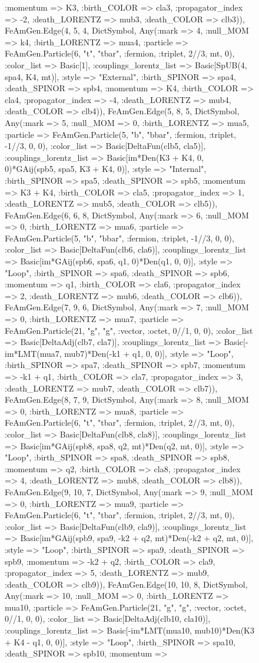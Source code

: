 \documentclass{revtex4}
\begin{document}
\begin{figure}[!htb]
\begin{center}
{:momentum => K3, :birth_COLOR => cla3, :propagator_index => -2, :death_LORENTZ => mub3, :death_COLOR => clb3)), FeAmGen.Edge(4, 5, 4, Dict{Symbol, Any}(:mark => 4, :null_MOM => k4, :birth_LORENTZ => mua4, :particle => FeAmGen.Particle(6, "t", "tbar", :fermion, :triplet, 2//3, mt, 0), :color_list => Basic[1], :couplings_lorentz_list => Basic[SpUB(4, spa4, K4, mt)], :style => "External", :birth_SPINOR => spa4, :death_SPINOR => spb4, :momentum => K4, :birth_COLOR => cla4, :propagator_index => -4, :death_LORENTZ => mub4, :death_COLOR => clb4)), FeAmGen.Edge(5, 8, 5, Dict{Symbol, Any}(:mark => 5, :null_MOM => 0, :birth_LORENTZ => mua5, :particle => FeAmGen.Particle(5, "b", "bbar", :fermion, :triplet, -1//3, 0, 0), :color_list => Basic[DeltaFun(clb5, cla5)], :couplings_lorentz_list => Basic[im*Den(K3 + K4, 0, 0)*GAij(spb5, spa5, K3 + K4, 0)], :style => "Internal", :birth_SPINOR => spa5, :death_SPINOR => spb5, :momentum => K3 + K4, :birth_COLOR => cla5, :propagator_index => 1, :death_LORENTZ => mub5, :death_COLOR => clb5)), FeAmGen.Edge(6, 6, 8, Dict{Symbol, Any}(:mark => 6, :null_MOM => 0, :birth_LORENTZ => mua6, :particle => FeAmGen.Particle(5, "b", "bbar", :fermion, :triplet, -1//3, 0, 0), :color_list => Basic[DeltaFun(clb6, cla6)], :couplings_lorentz_list => Basic[im*GAij(spb6, spa6, q1, 0)*Den(q1, 0, 0)], :style => "Loop", :birth_SPINOR => spa6, :death_SPINOR => spb6, :momentum => q1, :birth_COLOR => cla6, :propagator_index => 2, :death_LORENTZ => mub6, :death_COLOR => clb6)), FeAmGen.Edge(7, 9, 6, Dict{Symbol, Any}(:mark => 7, :null_MOM => 0, :birth_LORENTZ => mua7, :particle => FeAmGen.Particle(21, "g", "g", :vector, :octet, 0//1, 0, 0), :color_list => Basic[DeltaAdj(clb7, cla7)], :couplings_lorentz_list => Basic[-im*LMT(mua7, mub7)*Den(-k1 + q1, 0, 0)], :style => "Loop", :birth_SPINOR => spa7, :death_SPINOR => spb7, :momentum => -k1 + q1, :birth_COLOR => cla7, :propagator_index => 3, :death_LORENTZ => mub7, :death_COLOR => clb7)), FeAmGen.Edge(8, 7, 9, Dict{Symbol, Any}(:mark => 8, :null_MOM => 0, :birth_LORENTZ => mua8, :particle => FeAmGen.Particle(6, "t", "tbar", :fermion, :triplet, 2//3, mt, 0), :color_list => Basic[DeltaFun(clb8, cla8)], :couplings_lorentz_list => Basic[im*GAij(spb8, spa8, q2, mt)*Den(q2, mt, 0)], :style => "Loop", :birth_SPINOR => spa8, :death_SPINOR => spb8, :momentum => q2, :birth_COLOR => cla8, :propagator_index => 4, :death_LORENTZ => mub8, :death_COLOR => clb8)), FeAmGen.Edge(9, 10, 7, Dict{Symbol, Any}(:mark => 9, :null_MOM => 0, :birth_LORENTZ => mua9, :particle => FeAmGen.Particle(6, "t", "tbar", :fermion, :triplet, 2//3, mt, 0), :color_list => Basic[DeltaFun(clb9, cla9)], :couplings_lorentz_list => Basic[im*GAij(spb9, spa9, -k2 + q2, mt)*Den(-k2 + q2, mt, 0)], :style => "Loop", :birth_SPINOR => spa9, :death_SPINOR => spb9, :momentum => -k2 + q2, :birth_COLOR => cla9, :propagator_index => 5, :death_LORENTZ => mub9, :death_COLOR => clb9)), FeAmGen.Edge(10, 10, 8, Dict{Symbol, Any}(:mark => 10, :null_MOM => 0, :birth_LORENTZ => mua10, :particle => FeAmGen.Particle(21, "g", "g", :vector, :octet, 0//1, 0, 0), :color_list => Basic[DeltaAdj(clb10, cla10)], :couplings_lorentz_list => Basic[-im*LMT(mua10, mub10)*Den(K3 + K4 - q1, 0, 0)], :style => "Loop", :birth_SPINOR => spa10, :death_SPINOR => spb10, :momentum => }
\end{center}
\end{figure}
\end{document}
